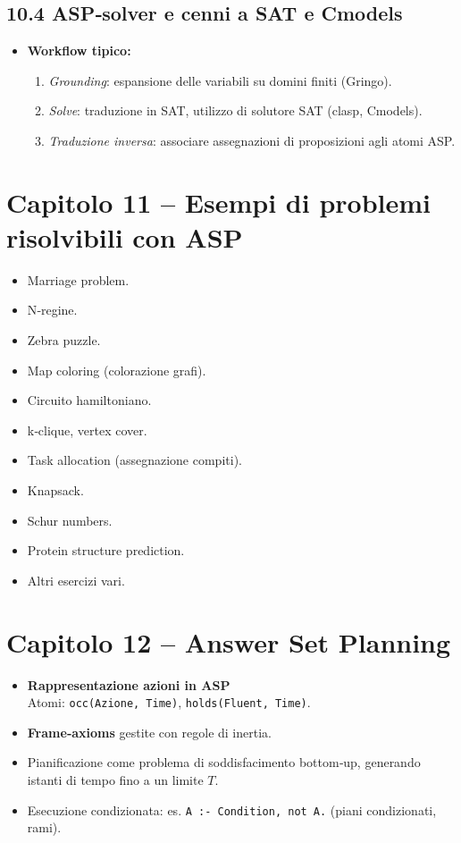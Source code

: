 \documentclass[12pt]{article}
\begin{document}
\subsection*{10.4 ASP‐solver e cenni a SAT e Cmodels}

\begin{itemize}
  \item \textbf{Workflow tipico:}
    \begin{enumerate}
      \item \emph{Grounding}: espansione delle variabili su domini finiti (Gringo).
      \item \emph{Solve}: traduzione in SAT, utilizzo di solutore SAT (clasp, Cmodels).
      \item \emph{Traduzione inversa}: associare assegnazioni di proposizioni agli atomi ASP.
    \end{enumerate}
\end{itemize}

\section*{Capitolo 11 – Esempi di problemi risolvibili con ASP}

\begin{itemize}
  \item Marriage problem.
  \item N‐regine.
  \item Zebra puzzle.
  \item Map coloring (colorazione grafi).
  \item Circuito hamiltoniano.
  \item k‐clique, vertex cover.
  \item Task allocation (assegnazione compiti).
  \item Knapsack.
  \item Schur numbers.
  \item Protein structure prediction.
  \item Altri esercizi vari.
\end{itemize}

\section*{Capitolo 12 – Answer Set Planning}

\begin{itemize}
  \item \textbf{Rappresentazione azioni in ASP}\\
    Atomi: \texttt{occ(Azione, Time)}, \texttt{holds(Fluent, Time)}.
  \item \textbf{Frame‐axioms} gestite con regole di inertia.
  \item Pianificazione come problema di soddisfacimento bottom‐up, generando istanti di tempo fino a un limite $T$.
  \item Esecuzione condizionata: es. \texttt{A :- Condition, not \neg A.} (piani condizionati, rami).
\end{itemize}
\end{document}
